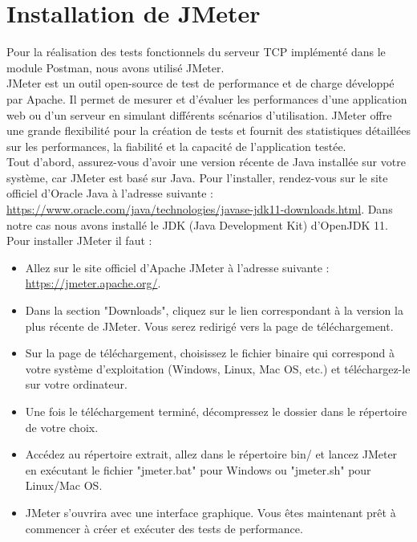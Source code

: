 \section{Installation de JMeter}

Pour la réalisation des tests fonctionnels du serveur TCP implémenté dans le module Postman, nous avons utilisé JMeter.\\

JMeter est un outil open-source de test de performance et de charge développé par Apache. Il permet de mesurer et d'évaluer les performances d'une application web ou d'un serveur en simulant différents scénarios d'utilisation. JMeter offre une grande flexibilité pour la création de tests et fournit des statistiques détaillées sur les performances, la fiabilité et la capacité de l'application testée.\\

Tout d'abord, assurez-vous d'avoir une version récente de Java installée sur votre système, car JMeter est basé sur Java. Pour l'installer, rendez-vous sur le site officiel d'Oracle Java à l'adresse suivante : \href{https://www.oracle.com/java/technologies/javase-jdk11-downloads.html}{https://www.oracle.com/java/technologies/javase-jdk11-downloads.html}.
Dans notre cas nous avons installé le JDK (Java Development Kit) d'OpenJDK 11.\\

Pour installer JMeter il faut :
\begin{itemize}
    \item Allez sur le site officiel d'Apache JMeter à l'adresse suivante : \href{https://jmeter.apache.org/}{https://jmeter.apache.org/}.
    \item Dans la section "Downloads", cliquez sur le lien correspondant à la version la plus récente de JMeter. Vous serez redirigé vers la page de téléchargement.
    \item Sur la page de téléchargement, choisissez le fichier binaire qui correspond à votre système d'exploitation (Windows, Linux, Mac OS, etc.) et téléchargez-le sur votre ordinateur.
    \item Une fois le téléchargement terminé, décompressez le dossier dans le répertoire de votre choix.
    \item Accédez au répertoire extrait, allez dans le répertoire bin/ et lancez JMeter en exécutant le fichier "jmeter.bat" pour Windows ou "jmeter.sh" pour Linux/Mac OS.
    \item JMeter s'ouvrira avec une interface graphique. Vous êtes maintenant prêt à commencer à créer et exécuter des tests de performance.
\end{itemize}
